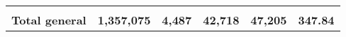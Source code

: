 \begin{tabular}{lrcclr}
	& \multicolumn{1}{l}{}                                           & \multicolumn{1}{l}{}                                       & \multicolumn{1}{l}{} &                                                                     & \multicolumn{1}{l}{}                                                         \\
	\rowcolor[HTML]{DDEBF7} 
	\textbf{Total   general}                                       & \textbf{1,357,075}                                             & \multicolumn{1}{r}{\cellcolor[HTML]{DDEBF7}\textbf{4,487}} & \textbf{42,718}      & \textbf{47,205}                                                     & \textbf{347.84}                                                             
\end{tabular}